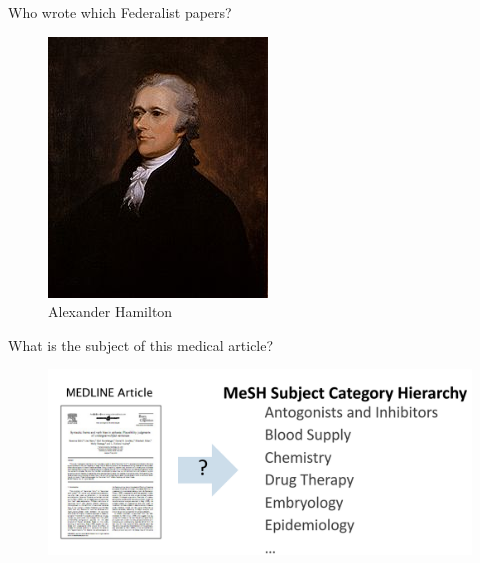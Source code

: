 \documentclass[handout]{beamer}
\begin{document}
\begin{frame}{Who wrote which Federalist papers?}
\begin{center}
\begin{figure}[h]
\begin{minipage}{0.3\textwidth}
                \centering
                \includegraphics[width=\linewidth]{pics/hamilton.png}
                \caption{Alexander Hamilton}
            \end{minipage}
        \end{figure}
    \end{center}
\end{frame}

\begin{frame}{What is the subject of this medical article?}

\begin{figure}[h]
\includegraphics[scale = 0.2]{pics/medarticle.png}
\end{figure}


\end{frame}
\end{document}
